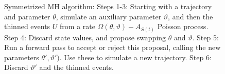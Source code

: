 \begin{figure}[h!]
\begin{minipage}[hp]{0.32\linewidth}
  \end{minipage}
    \caption{Symmetrized MH algorithm: Steps 1-3: Starting with a trajectory and parameter $\theta$, simulate an auxiliary parameter $\vartheta$, and then the thinned events
      $U$ from a rate $\Omega(\theta,\vartheta) - A_{S(t)}$ Poisson
      process. Step 4: Discard state values, and propose swapping $\theta$ and $\vartheta$. Step 5:
      Run a forward pass to accept or reject this proposal, calling the new parameters $\theta',\vartheta')$. 
    Use these to simulate a new trajectory. Step 6: Discard $\vartheta'$ and the thinned events.} 
   \label{fig:MH_improved}
  \end{figure}


